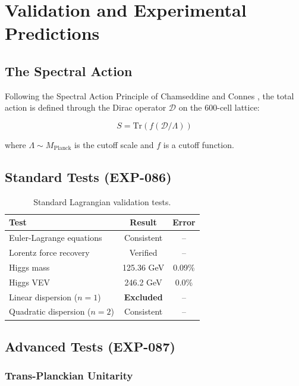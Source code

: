 \documentclass[12pt,a4paper]{article}
\begin{document}
\section{Validation and Experimental Predictions}

\subsection{The Spectral Action}

Following the Spectral Action Principle of Chamseddine and Connes \cite{chamseddine1997}, the total action is defined through the Dirac operator $\mathcal{D}$ on the 600-cell lattice:

\begin{equation}
S = \text{Tr}(f(\mathcal{D}/\Lambda))
\end{equation}

where $\Lambda \sim M_{\text{Planck}}$ is the cutoff scale and $f$ is a cutoff function.

\subsection{Standard Tests (EXP-086)}

\begin{table}[H]
\centering
\begin{tabular}{lcc}
\toprule
\textbf{Test} & \textbf{Result} & \textbf{Error} \\
\midrule
Euler-Lagrange equations & Consistent & -- \\
Lorentz force recovery & Verified & -- \\
Higgs mass & 125.36 GeV & 0.09\% \\
Higgs VEV & 246.2 GeV & 0.0\% \\
Linear dispersion ($n=1$) & \textbf{Excluded} & -- \\
Quadratic dispersion ($n=2$) & Consistent & -- \\
\bottomrule
\end{tabular}
\caption{Standard Lagrangian validation tests.}
\end{table}

\subsection{Advanced Tests (EXP-087)}

\subsubsection{Trans-Planckian Unitarity}
\end{document}
